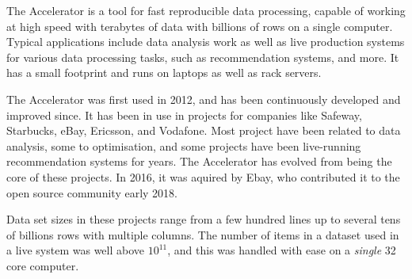 
The Accelerator is a tool for fast reproducible data processing, capable of working
at high speed with terabytes of data with billions of rows on a single
computer.  Typical applications include data analysis work as well as
live production systems for various data processing tasks, such as
recommendation systems, and more.  It has a small footprint and runs
on laptops as well as rack servers.

The Accelerator was first used in 2012, and has been continuously developed and
improved since.  It has been in use in projects for companies like
Safeway, Starbucks, eBay, Ericsson, and Vodafone.  Most project have
been related to data analysis, some to optimisation, and some projects
have been live-running recommendation systems for years.  The
Accelerator has evolved from being the core of these projects.  In
2016, it was aquired by Ebay, who contributed it to the open source
community early 2018.

Data set sizes in these projects range from a few hundred lines up to
several tens of billions rows with multiple columns.  The number of
items in a dataset used in a live system was well above $10^{11}$, and
this was handled with ease on a \emph{single} 32 core computer.

